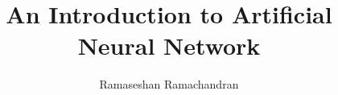 
\title{An Introduction to Artificial Neural Network}
\author[RR]{Ramaseshan Ramachandran}
\date{}

\begin{frame}
	\maketitle
\end{frame}
	
